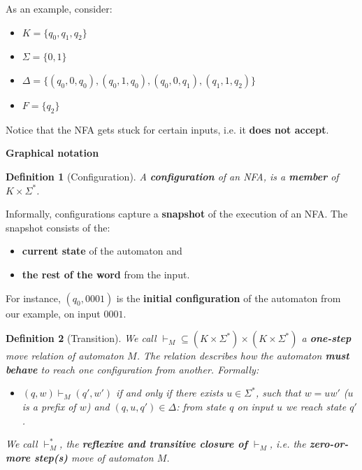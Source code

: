 \documentclass[a4paper, 12pt]{article}
\newtheorem*{theorem}{Definition}
\begin{document}
As an example, consider:
  \begin{itemize}
  	\item  $K=\{q_0,q_1,q_2\}$
  	\item  $\Sigma=\{0,1\}$
  	\item  $\Delta=\{(q_0,0,q_0),(q_0,1,q_0),(q_0,0,q_1),(q_1,1,q_2)\}$
  	\item  $F = \{q_2\}$
  \end{itemize}

Notice that the NFA gets stuck for certain inputs, i.e. it \textbf{does not accept}.

\textbf{Graphical notation}

\begin{theorem}[Configuration]

A \textbf{configuration} of an NFA, is a \textbf{member} of $K\times \Sigma^*$.

\end{theorem}
Informally, configurations capture a \textbf{snapshot} of the execution of an NFA. The snapshot consists of the:
  \begin{itemize}
  	\item  \textbf{current state} of the automaton and
  	\item  \textbf{the rest of the word} from the input.
  \end{itemize}

For instance, $(q_0,0001)$ is the \textbf{initial configuration} of the automaton from our example, on input $0001$.

\begin{theorem}[Transition]

We call $\vdash_M \subseteq (K\times \Sigma^*) \times (K\times\Sigma^*)$ a \textbf{one-step} move relation of automaton $M$. The relation describes how the automaton \textbf{must behave} to reach one configuration from another. Formally: 
  \begin{itemize}
  	\item  $(q,w) \vdash_M (q',w')$ if and only if there exists $u\in\Sigma^*$, such that $w=uw'$ ($u$ is a prefix of $w$) and $(q,u,q')\in\Delta$: from state $q$ on input $u$ we reach state $q'$.
  \end{itemize}

We call $\vdash_M^*$, the \textbf{reflexive and transitive closure of} $\vdash_M$, i.e. the \textbf{zero-or-more step(s)} move of automaton $M$.

\end{theorem}
\end{document}
